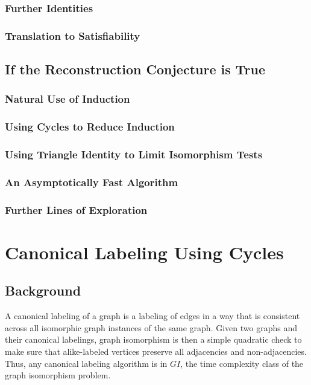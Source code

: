 \documentclass[11pt,a4paper]{report}
\begin{document}
\subsection{Further Identities}
\subsection{Translation to Satisfiability}

\section{If the Reconstruction Conjecture is True}
\subsection{Natural Use of Induction}
\subsection{Using Cycles to Reduce Induction}
\subsection{Using Triangle Identity to Limit Isomorphism Tests}
\subsection{An Asymptotically Fast Algorithm}
\subsection{Further Lines of Exploration}



\chapter{Canonical Labeling Using Cycles}
\section{Background}
A canonical labeling of a graph is a labeling of edges in a way that is consistent across all isomorphic graph instances of the same graph.
Given two graphs and their canonical labelings, graph isomorphism is then a simple quadratic check to make sure that alike-labeled vertices preserve all adjacencies and non-adjacencies. 
Thus, any canonical labeling algorithm is in $GI$, the time complexity class of the graph isomorphism problem.
\end{document}
